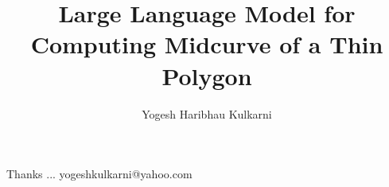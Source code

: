 \documentclass[xcolor=dvipsnames,compress,t,pdf,9pt]{beamer}
\title[\insertframenumber /\inserttotalframenumber]{Large Language Model for Computing Midcurve of a Thin Polygon}
\subtitle[]{Yogesh Haribhau Kulkarni}
\begin{document}
	\begin{frame}
	\titlepage
%
	\end{frame}
	
%	
	
	
	\begin{frame}[c]{}
	Thanks ...
	\vspace{5mm}
	yogeshkulkarni@yahoo.com
	\end{frame}
\end{document}
